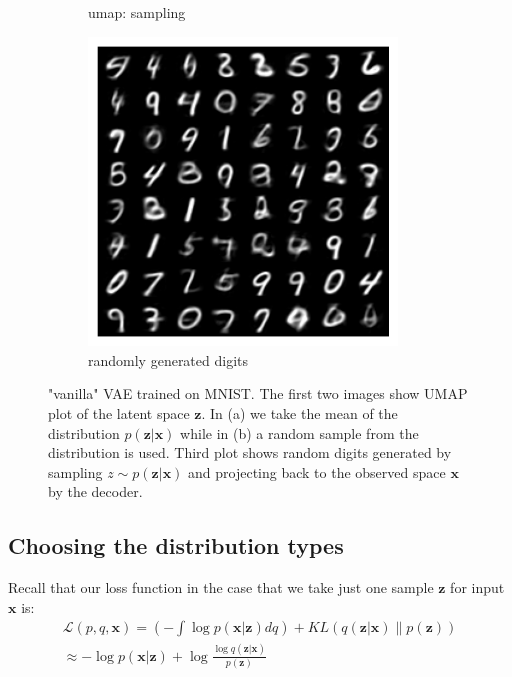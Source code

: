 \documentclass[11pt, a4paper]{report}
\theoremstyle{plain}
\theoremstyle{definition}
\theoremstyle{remark}
\newcommand{\x}{\mathbf{x}}
\newcommand{\z}{\mathbf{z}}
\newcommand{\LL}{\mathcal{L}}
\begin{document}
\begin{figure}[h]
\begin{subfigure}[t]{0.3\textwidth}
\caption{umap: sampling}
\label{fig:vaeumapsamples}
\end{subfigure}
\begin{subfigure}[t]{0.3\textwidth}
\includegraphics[width=0.9\textwidth]{images/vae.generation.mnist.sampling.png}
\caption{randomly generated digits}
\label{fig:vaegen}
\end{subfigure}
\caption{"vanilla" VAE trained on MNIST. The first two images show 
UMAP plot of the latent space $\z$.
In (a) we take the mean of the distribution $p(\z | \x)$ while in (b)
a random sample from the distribution is used.
Third plot shows random digits generated by sampling $z \sim p(\z | \x)$
and projecting back to the observed space $\x$ by the decoder.}
\label{fig:vaeumap}
\end{figure}


\subsection{Choosing the distribution types}

Recall that our loss function in the case that we take just one sample $\z$ for input $\x$
is:
\begin{equation}
\label{eq:vanillavaeloss}
\begin{aligned}
\LL(p,q,\x) 
= (-\int \log p (\x | \z)dq) + KL(q(\z | \x) \| p(\z)) \\
\approx -\log p (\x | \z) + \log \frac{\log q(\z | \x)}{p(\z)}
\end{aligned}
\end{equation}
\end{document}
